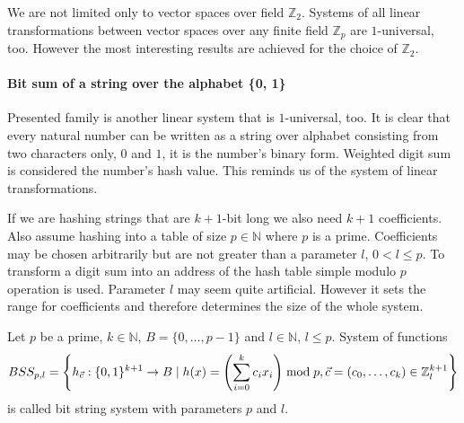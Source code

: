 We are not limited only to vector spaces over field $\mathbb{Z}_2$. Systems of all linear transformations between vector spaces over any finite field $\mathbb{Z}_p$ are $1$-universal, too. However the most interesting results are achieved for the choice of $\mathbb{Z}_2$.

\paragraph{Bit sum of a string over the alphabet \{0, 1\}}
Presented family is another linear system that is $1$-universal, too. It is clear that every natural number can be written as a string over alphabet consisting from two characters only, $0$ and $1$, it is the number's binary form. Weighted digit sum is considered the number's hash value. This reminds us of the system of linear transformations.

If we are hashing strings that are $k + 1$-bit long we also need $k + 1$ coefficients. Also assume hashing into a table of size $p \in \mathbb{N}$ where $p$ is a prime. Coefficients may be chosen arbitrarily but are not greater than a parameter $l$, $0 < l \leq p$. To transform a digit sum into an address of the hash table simple modulo $p$ operation is used. Parameter $l$ may seem quite artificial. However it sets the range for coefficients and therefore determines the size of the whole system.

\begin{definition}
Let $p$ be a prime, $k \in \mathbb{N}$, $B = \{0, \dots, p - 1 \}$ and $l \in \mathbb{N}$, $l \leq p$. System of functions
\begin{displaymath}
BSS_{p, l} = \left\{ h_{\vec{c}}: \{0, 1\}^{k + 1} \rightarrow B \mid h(x) = \left(\displaystyle \sum_{i=0}^{k} c_i x_i\right) \bmod p, \vec{c} = (c_0, \dots, c_k)  \in \mathbb{Z}_l^{k + 1} \right\}
\end{displaymath} 
is called bit string system with parameters $p$ and $l$.
\end{definition}

